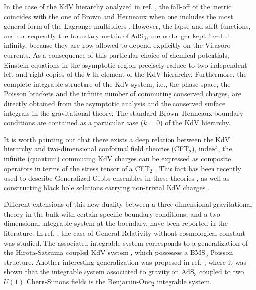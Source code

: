 \documentclass[letterpaper,11pt,oneside]{book}
\begin{document}
In the case of the KdV hierarchy analyzed in ref. \cite{Perez:2016vqo},
the fall-off of the metric coincides with the one of Brown and Henneaux
when one includes the most general form of the Lagrange multipliers
\cite{Henneaux:2013dra,Bunster:2014mua}. However, the lapse and shift
functions, and consequently the boundary metric of AdS$_{3}$, are
no longer kept fixed at infinity, because they are now allowed to
depend explicitly on the Virasoro currents. As a consequence of this
particular choice of chemical potentials, Einstein equations in the
asymptotic region precisely reduce to two independent left and right
copies of the $k$-th element of the KdV hierarchy. Furthermore, the
complete integrable structure of the KdV system, i.e., the phase space,
the Poisson brackets and the infinite number of commuting conserved
charges, are directly obtained from the asymptotic analysis and the
conserved surface integrals in the gravitational theory. The standard
Brown--Henneaux boundary conditions \cite{Brown:1986nw} are contained
as a particular case ($k=0$) of the KdV hierarchy.

It is worth pointing out that there exists a deep relation between
the KdV hierarchy and two-dimensional conformal field theories (CFT$_{2}$),
indeed, the infinite (quantum) commuting KdV charges can be expressed
as composite operators in terms of the stress tensor of a CFT$_{2}$
\cite{Sasaki:1987mm,Eguchi:1989hs,Bazhanov:1994ft}. This fact has
been recently used to describe Generalized Gibbs ensembles in these
theories \cite{Calabrese:2011vdk,Sotiriadis:2014uza,PhysRevLett.115.157201,Vidmar_2016,deBoer:2016bov,Perez:2016vqo,Pozsgay_2017,Dymarsky:2018lhf,Maloney:2018hdg,Maloney:2018yrz,Dymarsky:2018iwx,Brehm:2019fyy,Dymarsky:2019etq},
as well as constructing black hole solutions carrying non-trivial
KdV charges \cite{Dymarsky:2020tjh}.

Different extensions of this new duality between a three-dimensional gravitational
theory in the bulk with certain specific boundary conditions, and a two-dimensional integrable system at the boundary, have been reported in the literature. In ref. \cite{Fuentealba:2017omf}, the case of General Relativity without cosmological constant was studied. The associated integrable system corresponds to a generalization of
the Hirota-Satsuma coupled KdV system \cite{Hirota:1981wb}, which
possesses a BMS$_{3}$ Poisson structure. Another interesting generalization was proposed in ref. \cite{Melnikov:2018fhb}, where it was shown that the integrable system associated to gravity on AdS$_{3}$ coupled to two $U(1)$ Chern-Simons fields is the Benjamin-Ono$_{2}$ integrable system. 
\end{document}
